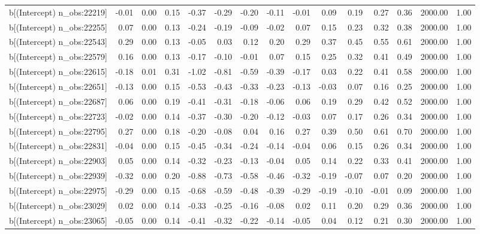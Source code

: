 \begin{table}[ht]
\begin{tabular}{rrrrrrrrrrrrrrr}
  b[(Intercept) n\_obs:22219] & -0.01 & 0.00 & 0.15 & -0.37 & -0.29 & -0.20 & -0.11 & -0.01 & 0.09 & 0.19 & 0.27 & 0.36 & 2000.00 & 1.00 \\ 
  b[(Intercept) n\_obs:22255] & 0.07 & 0.00 & 0.13 & -0.24 & -0.19 & -0.09 & -0.02 & 0.07 & 0.15 & 0.23 & 0.32 & 0.38 & 2000.00 & 1.00 \\ 
  b[(Intercept) n\_obs:22543] & 0.29 & 0.00 & 0.13 & -0.05 & 0.03 & 0.12 & 0.20 & 0.29 & 0.37 & 0.45 & 0.55 & 0.61 & 2000.00 & 1.00 \\ 
  b[(Intercept) n\_obs:22579] & 0.16 & 0.00 & 0.13 & -0.17 & -0.10 & -0.01 & 0.07 & 0.15 & 0.25 & 0.32 & 0.41 & 0.49 & 2000.00 & 1.00 \\ 
  b[(Intercept) n\_obs:22615] & -0.18 & 0.01 & 0.31 & -1.02 & -0.81 & -0.59 & -0.39 & -0.17 & 0.03 & 0.22 & 0.41 & 0.58 & 2000.00 & 1.00 \\ 
  b[(Intercept) n\_obs:22651] & -0.13 & 0.00 & 0.15 & -0.53 & -0.43 & -0.33 & -0.23 & -0.13 & -0.03 & 0.07 & 0.16 & 0.25 & 2000.00 & 1.00 \\ 
  b[(Intercept) n\_obs:22687] & 0.06 & 0.00 & 0.19 & -0.41 & -0.31 & -0.18 & -0.06 & 0.06 & 0.19 & 0.29 & 0.42 & 0.52 & 2000.00 & 1.00 \\ 
  b[(Intercept) n\_obs:22723] & -0.02 & 0.00 & 0.14 & -0.37 & -0.30 & -0.20 & -0.12 & -0.03 & 0.07 & 0.17 & 0.26 & 0.34 & 2000.00 & 1.00 \\ 
  b[(Intercept) n\_obs:22795] & 0.27 & 0.00 & 0.18 & -0.20 & -0.08 & 0.04 & 0.16 & 0.27 & 0.39 & 0.50 & 0.61 & 0.70 & 2000.00 & 1.00 \\ 
  b[(Intercept) n\_obs:22831] & -0.04 & 0.00 & 0.15 & -0.45 & -0.34 & -0.24 & -0.14 & -0.04 & 0.06 & 0.15 & 0.26 & 0.34 & 2000.00 & 1.00 \\ 
  b[(Intercept) n\_obs:22903] & 0.05 & 0.00 & 0.14 & -0.32 & -0.23 & -0.13 & -0.04 & 0.05 & 0.14 & 0.22 & 0.33 & 0.41 & 2000.00 & 1.00 \\ 
  b[(Intercept) n\_obs:22939] & -0.32 & 0.00 & 0.20 & -0.88 & -0.73 & -0.58 & -0.46 & -0.32 & -0.19 & -0.07 & 0.07 & 0.20 & 2000.00 & 1.00 \\ 
  b[(Intercept) n\_obs:22975] & -0.29 & 0.00 & 0.15 & -0.68 & -0.59 & -0.48 & -0.39 & -0.29 & -0.19 & -0.10 & -0.01 & 0.09 & 2000.00 & 1.00 \\ 
  b[(Intercept) n\_obs:23029] & 0.02 & 0.00 & 0.14 & -0.33 & -0.25 & -0.16 & -0.08 & 0.02 & 0.11 & 0.20 & 0.29 & 0.36 & 2000.00 & 1.00 \\ 
  b[(Intercept) n\_obs:23065] & -0.05 & 0.00 & 0.14 & -0.41 & -0.32 & -0.22 & -0.14 & -0.05 & 0.04 & 0.12 & 0.21 & 0.30 & 2000.00 & 1.00 \\ 

\end{tabular}
\end{table}

